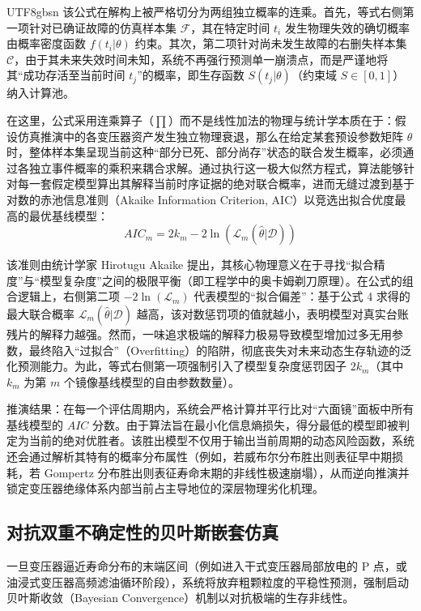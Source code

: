 \documentclass[journal]{IEEEtran}
\begin{document}
\begin{CJK*}{UTF8}{gbsn}
该公式在解构上被严格切分为两组独立概率的连乘。首先，等式右侧第一项针对已确证故障的仿真样本集 $\mathcal{F}$，其在特定时间 $t_i$ 发生物理失效的确切概率由概率密度函数 $f(t_i|\theta)$ 约束。其次，第二项针对尚未发生故障的右删失样本集 $\mathcal{C}$，由于其未来失效时间未知，系统不再强行预测单一崩溃点，而是严谨地将其“成功存活至当前时间 $t_j$”的概率，即生存函数 $S(t_j|\theta)$（约束域 $S \in [0,1]$）纳入计算池。

在这里，公式采用连乘算子（$\prod$）而不是线性加法的物理与统计学本质在于：假设仿真推演中的各变压器资产发生独立物理衰退，那么在给定某套预设参数矩阵 $\theta$ 时，整体样本集呈现当前这种“部分已死、部分尚存”状态的联合发生概率，必须通过各独立事件概率的乘积来耦合求解。通过执行这一极大似然方程式，算法能够针对每一套假定模型算出其解释当前时序证据的绝对联合概率，进而无缝过渡到基于对数的赤池信息准则（Akaike Information Criterion, AIC）以竞选出拟合优度最高的最优基线模型：
\begin{equation}
AIC_m = 2k_m - 2 \ln(\mathcal{L}_m(\hat{\theta} | \mathcal{D}))
\end{equation}

该准则由统计学家 Hirotugu Akaike 提出，其核心物理意义在于寻找“拟合精度”与“模型复杂度”之间的极限平衡（即工程学中的奥卡姆剃刀原理）。在公式的组合逻辑上，右侧第二项 $-2 \ln(\mathcal{L}_m)$ 代表模型的“拟合偏差”：基于公式 4 求得的最大联合概率 $\mathcal{L}_m(\hat{\theta} | \mathcal{D})$ 越高，该对数惩罚项的值就越小，表明模型对真实台账残片的解释力越强。然而，一味追求极端的解释力极易导致模型增加过多无用参数，最终陷入“过拟合”（Overfitting）的陷阱，彻底丧失对未来动态生存轨迹的泛化预测能力。为此，等式右侧第一项强制引入了模型复杂度惩罚因子 $2k_m$（其中 $k_m$ 为第 $m$ 个镜像基线模型的自由参数数量）。

推演结果：在每一个评估周期内，系统会严格计算并平行比对“六面镜”面板中所有基线模型的 $AIC$ 分数。由于算法旨在最小化信息熵损失，得分最低的模型即被判定为当前的绝对优胜者。该胜出模型不仅用于输出当前周期的动态风险函数，系统还会通过解析其特有的概率分布属性（例如，若威布尔分布胜出则表征早中期损耗，若 Gompertz 分布胜出则表征寿命末期的非线性极速崩塌），从而逆向推演并锁定变压器绝缘体系内部当前占主导地位的深层物理劣化机理。

\subsection{对抗双重不确定性的贝叶斯嵌套仿真}
一旦变压器逼近寿命分布的末端区间（例如进入干式变压器局部放电的 P 点，或油浸式变压器高频滤油循环阶段），系统将放弃粗颗粒度的平稳性预测，强制启动贝叶斯收敛（Bayesian Convergence）机制以对抗极端的生存非线性。


\end{CJK*}
\end{document}
